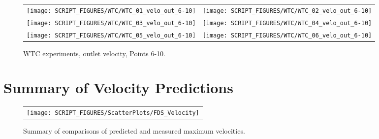 \begin{figure}[p]
\begin{tabular*}{\textwidth}{l@{\extracolsep{\fill}}r}
\texttt{[image: SCRIPT\_FIGURES/WTC/WTC\_01\_velo\_out\_6-10]} &
\texttt{[image: SCRIPT\_FIGURES/WTC/WTC\_02\_velo\_out\_6-10]} \\
\texttt{[image: SCRIPT\_FIGURES/WTC/WTC\_03\_velo\_out\_6-10]} &
\texttt{[image: SCRIPT\_FIGURES/WTC/WTC\_04\_velo\_out\_6-10]} \\
\texttt{[image: SCRIPT\_FIGURES/WTC/WTC\_05\_velo\_out\_6-10]} &
\texttt{[image: SCRIPT\_FIGURES/WTC/WTC\_06\_velo\_out\_6-10]}
\end{tabular*}
\caption[WTC experiments, outlet velocity, Points 6-10]{WTC experiments, outlet velocity, Points 6-10.}
\label{WTC_velo_out_6-10}
\end{figure}



\clearpage

\section{Summary of Velocity Predictions}
\label{Velocity}

\begin{figure}[h!]
\begin{center}
\begin{tabular}{l}
\texttt{[image: SCRIPT\_FIGURES/ScatterPlots/FDS\_Velocity]}
\end{tabular}
\end{center}
\caption[Summary of velocity predictions]
{Summary of comparisons of predicted and measured maximum velocities.}
\label{Steckler_Scatterplot}
\end{figure}


